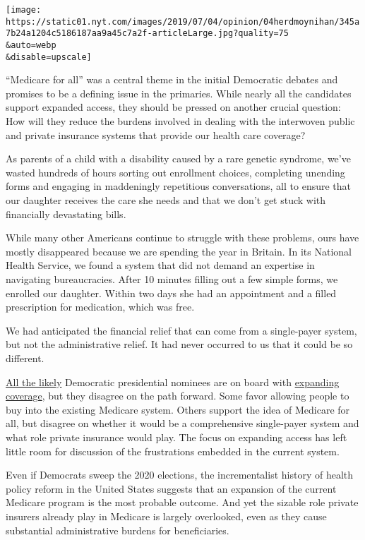 \texttt{[image: https://static01.nyt.com/images/2019/07/04/opinion/04herdmoynihan/345a7b24a1204c5186187aa9a45c7a2f-articleLarge.jpg?quality=75\\\&auto=webp\\\&disable=upscale]}

``Medicare for all'' was a central theme in the initial Democratic
debates and promises to be a defining issue in the primaries. While
nearly all the candidates support expanded access, they should be
pressed on another crucial question: How will they reduce the burdens
involved in dealing with the interwoven public and private insurance
systems that provide our health care coverage?

As parents of a child with a disability caused by a rare genetic
syndrome, we've wasted hundreds of hours sorting out enrollment choices,
completing unending forms and engaging in maddeningly repetitious
conversations, all to ensure that our daughter receives the care she
needs and that we don't get stuck with financially devastating bills.

While many other Americans continue to struggle with these problems,
ours have mostly disappeared because we are spending the year in
Britain. In its National Health Service, we found a system that did not
demand an expertise in navigating bureaucracies. After 10 minutes
filling out a few simple forms, we enrolled our daughter. Within two
days she had an appointment and a filled prescription for medication,
which was free.

We had anticipated the financial relief that can come from a
single-payer system, but not the administrative relief. It had never
occurred to us that it could be so different.

\href{https://www.nytimes.com/2019/06/23/us/politics/2020-democrats-medicare-for-all-public-option.html?module=inline}{All
the likely} Democratic presidential nominees are on board with
\href{https://www.kff.org/medicare/issue-brief/medicare-for-all-and-public-plan-buy-in-proposals-overview-and-key-issues/}{expanding
coverage}, but they disagree on the path forward. Some favor allowing
people to buy into the existing Medicare system. Others support the idea
of Medicare for all, but disagree on whether it would be a comprehensive
single-payer system and what role private insurance would play. The
focus on expanding access has left little room for discussion of the
frustrations embedded in the current system.

Even if Democrats sweep the 2020 elections, the incrementalist history
of health policy reform in the United States suggests that an expansion
of the current Medicare program is the most probable outcome. And yet
the sizable role private insurers already play in Medicare is largely
overlooked, even as they cause substantial administrative burdens for
beneficiaries.

